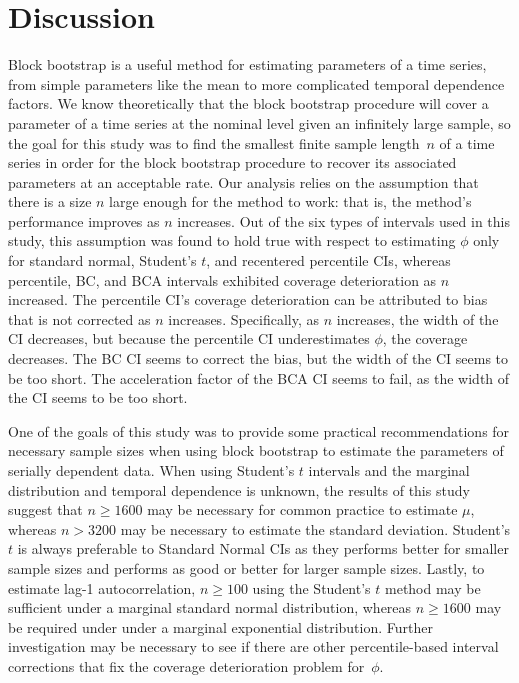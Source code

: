 \documentclass[10pt]{article}
\newcommand{\jy}[1]{\textcolor{blue}{JY: #1}}
\newcommand{\mc}[1]{\textcolor{orange}{MC: (#1)}}
\begin{document}
\section*{Discussion}
\label{sec:disc}

Block bootstrap is a useful method for estimating parameters of a time series,
from simple parameters like the mean to more complicated temporal dependence
factors. We know theoretically that the block bootstrap procedure will cover a 
parameter of a time series at the nominal level given an infinitely large
sample,\citep{calhoun2018} so the goal for this study was to find the smallest 
finite sample length~$n$
of a time series in order for the block bootstrap procedure to recover its 
associated parameters at an acceptable rate. Our analysis relies on the 
assumption that there is a size $n$ large enough for the method to work: that 
is, the method's performance improves as $n$ increases. Out of the six types of 
intervals used in this study, this assumption was found to hold true with 
respect to estimating $\phi$ only for standard normal, Student's $t$, and recentered 
percentile CIs, whereas percentile, BC, and BCA intervals exhibited coverage 
deterioration as $n$ increased. The percentile CI's coverage deterioration can 
be attributed to bias that is not corrected as $n$ increases. Specifically, as 
$n$ increases, the width of the CI decreases, but because the percentile CI 
underestimates $\phi$, the coverage decreases. The BC CI seems to correct the 
bias, but the width of the CI seems to be too short. The acceleration factor 
of the BCA CI seems to fail, as the width of the CI seems to be too
short.


One of the goals of this study was to provide some practical recommendations for
necessary sample sizes when using block bootstrap to estimate the parameters of
serially dependent data. When using Student's $t$ intervals and the
marginal distribution and temporal dependence is 
unknown, the results of this study suggest that $n \geq 1600$ may be necessary 
for common practice to estimate $\mu$, whereas $n > 3200$ may be necessary
to estimate the standard deviation. Student's $t$ is always preferable to
Standard Normal CIs
as they performs better for smaller sample sizes and performs as good or better
for larger sample sizes. Lastly, to estimate lag-1 autocorrelation,
$n \geq 100$ using the Student's $t$ method may be sufficient under
a marginal standard normal distribution, whereas $n \geq 1600$ may be required
under under a marginal exponential distribution. Further
investigation may be necessary to see if there are other percentile-based 
interval corrections that fix the coverage deterioration problem for~$\phi$.
\end{document}
